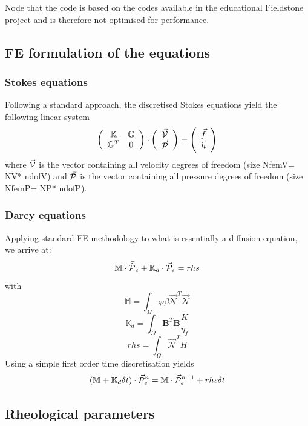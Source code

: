 \documentclass[a4paper]{article}
\newcommand{\K}{{\mathbb{K}}}
\newcommand{\G}{{\mathbb{G}}}
\newcommand{\M}{{\mathbb{M}}}
\newcommand{\bN}{{\mathcal{N}}}
\newcommand{\python}{\color{darkgray} \sffamily }
\begin{document}
Node that the code is based on the codes available in the educational Fieldstone project
and is therefore not optimised for performance.

\subsection{FE formulation of the equations}


\subsubsection{Stokes equations}

Following a standard approach, the discretised Stokes equations yield
the following linear system
\[
\left(
\begin{array}{cc}
\K & \G \\
\G^T & 0 
\end{array}
\right)
\cdot
\left(
\begin{array}{c}
\vec{\cal V} \\ 
\vec{\cal P}
\end{array}
\right)
=
\left(
\begin{array}{c}
\vec{f} \\ 
\vec{h}
\end{array}
\right)
\]
where $\vec{\cal V}$ is the vector containing all velocity degrees of freedom (size {\python NfemV}={\python NV}*{\python ndofV})
and $\vec{\cal P}$ is the vector containing all pressure degrees of freedom (size {\python NfemP}={\python NP}*{\python ndofP}).



\subsubsection{Darcy equations}
Applying standard FE methodology to what is essentially a diffusion equation, we arrive at:
\[
{\M} \cdot {\vec{\dot{\cal{P}}}}_e  + {\K}_d \cdot \vec{\cal P}_e = rhs
\]
with
\[
{\M} = \int_\Omega \varphi \beta \vec{\bN}^T \vec{\bN} 
\]
\[
\K_d = \int_\Omega {\bm B}^T {\bm B} \frac{K}{\eta_f} 
\]
\[
rhs = \int_\Omega \vec\bN^T  H 
\]
Using a simple first order time discretisation yields
\[
({\M} + {\K}_d \delta t) \cdot \vec{\cal P}_e^n = \M \cdot \vec{\cal P}_e^{n-1} + rhs \delta t
\]


\subsection{Rheological parameters}
\end{document}

